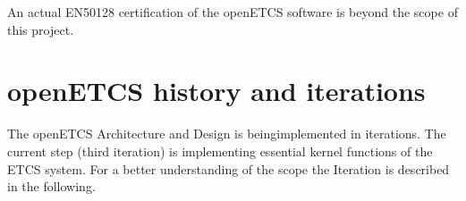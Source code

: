 An actual EN50128 certification of the openETCS software is beyond the scope of this project.


%
%



\section{openETCS history and iterations}
The openETCS Architecture and Design is beingimplemented in iterations. The current step (third iteration) is implementing essential kernel functions of the ETCS system. 
For a better understanding of the scope the Iteration is described in the following.

